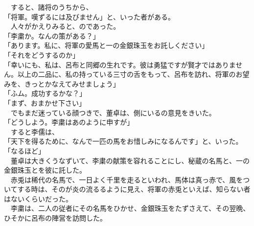 \documentclass[
  paper=a5,
  fontsize=10pt,
  jafontsize=9.5pt,
  tate,                  %
  open_bracket_pos=nibu, %
]{jlreq}
\begin{document}
　すると、諸将のうちから、\\


「将軍。嘆ずるには及びません」と、いった者がある。\\


　人々がかえりみると、のであった。\\


「李粛か。なんの策がある？」\\


「あります。私に、将軍の愛馬と一の金銀珠玉をお託しください」\\


「それをどうするのか」\\


「幸いにも、私は、呂布と同郷の生れです。彼は勇猛ですが賢才ではありません。以上の二品に、私の持っている三寸の舌をもって、呂布を訪れ、将軍のお望みを、きっとかなえてみせましょう」\\


「ふム。成功するかな？」\\


「まず、おまかせ下さい」\\


　でもまだ迷っている顔つきで、董卓は、側にいるの意見をきいた。\\


「どうしよう。李粛はあのように申すが」\\


　すると李儒は、\\


「天下を得るために、なんで一匹の馬をお惜しみになるんです」と、いった。\\


「なるほど」\\


　董卓は大きくうなずいて、李粛の献策を容れることにし、秘蔵の名馬と、一の金銀珠玉とを彼に託した。\\


　赤兎は稀代の名馬で、一日よく千里を走るといわれ、馬体は真っ赤で、風をついてする時は、そのが炎の流るるように見え、将軍の赤兎といえば、知らない者はないくらいだった。\\


　李粛は、二人の従者にその名馬をひかせ、金銀珠玉をたずさえて、その翌晩、ひそかに呂布の陣営を訪問した。\\
\end{document}

